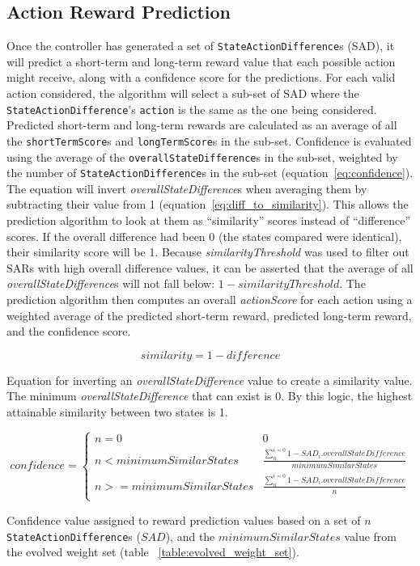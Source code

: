 \subsection{Action Reward Prediction}
Once the controller has generated a set of \texttt{StateActionDifference}s (SAD), it will predict a short-term and long-term reward value that each possible action might receive, along with a confidence score for the predictions.
For each valid action considered, the algorithm will select a sub-set of SAD where the \texttt{StateActionDifference}'s \texttt{action} is the same as the one being considered.
Predicted short-term and long-term rewards are calculated as an average of all the \texttt{shortTermScore}s and \texttt{longTermScore}s in the sub-set.
Confidence is evaluated using the average of the \texttt{overallStateDifference}s in the sub-set, weighted by the number of \texttt{StateActionDifference}s in the sub-set (equation~\ref{eq:confidence}).
The equation will invert \textit{overallStateDifference}s when averaging them by subtracting their value from 1 (equation~\ref{eq:diff_to_similarity}).
This allows the prediction algorithm to look at them as ``similarity'' scores instead of ``difference'' scores.
If the overall difference had been 0 (the states compared were identical), their similarity score will be 1.
Because \textit{similarityThreshold} was used to filter out SARs with high overall difference values, it can be asserted that the average of all \textit{overallStateDifference}s will not fall below: $1 - similarityThreshold$.
The prediction algorithm then computes an overall \textit{actionScore} for each action using a weighted average of the predicted short-term reward, predicted long-term reward, and the confidence score.

\begin{capeq}
\begin{equation} \label{eq:diff_to_similarity}
  similarity = 1 - difference
\end{equation}
\caption{Equation for inverting an \textit{overallStateDifference} value to create a similarity value. The minimum \textit{overallStateDifference} that can exist is 0. By this logic, the highest attainable similarity between two states is 1.}
\end{capeq}

\begin{capeq}
\begin{equation} \label{eq:confidence}
  confidence = \begin{cases}
    n = 0 & 0 \\
    n < minimumSimilarStates & \frac{\sum_{n}^{i=0} 1 - SAD_{i}.overallStateDifference}{minimumSimilarStates} \\
    n >= minimumSimilarStates & \frac{\sum_{n}^{i=0} 1 - SAD_{i}.overallStateDifference}{n} \\
\end{cases}
\end{equation}
\caption{Confidence value assigned to reward prediction values based on a set of $n$ \texttt{StateActionDifference}s ($SAD$), and the $minimumSimilarStates$ value from the evolved weight set (table ~\ref{table:evolved_weight_set}).}
\end{capeq}

